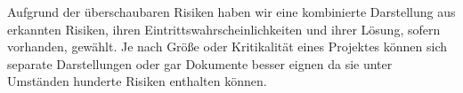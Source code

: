 Aufgrund der überschaubaren Risiken haben wir eine kombinierte Darstellung aus erkannten Risiken, ihren Eintrittswahrscheinlichkeiten und ihrer Lösung, sofern vorhanden, gewählt. Je nach Größe oder Kritikalität eines Projektes können sich separate Darstellungen oder gar Dokumente besser eignen da sie unter Umständen hunderte Risiken enthalten können.